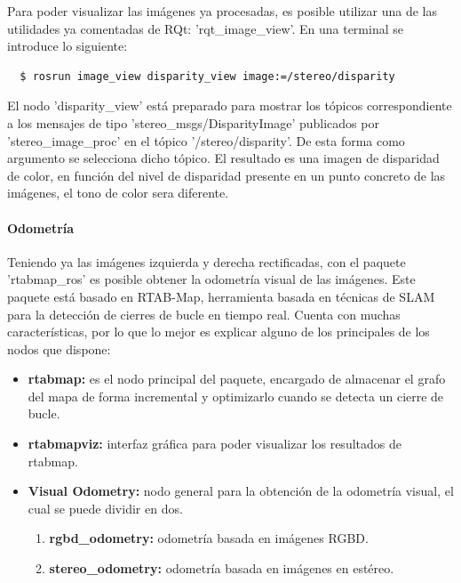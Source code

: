 Para poder visualizar las imágenes ya procesadas, es posible utilizar una de las
utilidades ya comentadas de RQt: 'rqt\_image\_view'. En una terminal se
introduce lo siguiente:
\\
\begin{lstlisting}
  $ rosrun image_view disparity_view image:=/stereo/disparity
\end{lstlisting}

El nodo 'disparity\_view' está preparado para mostrar los tópicos
correspondiente a los mensajes de tipo 'stereo\_msgs/DisparityImage' publicados
por 'stereo\_image\_proc' en el tópico '/stereo/disparity'. De esta forma como
argumento se selecciona dicho tópico. El resultado es una imagen de disparidad
de color, en función del nivel de disparidad presente en un punto concreto de
las imágenes, el tono de color sera diferente.

\paragraph{Odometría} \hspace{0pt}

Teniendo ya las imágenes izquierda y derecha rectificadas, con el paquete
'rtabmap\_ros' es posible obtener la odometría visual de las imágenes. Este
paquete está basado en RTAB-Map, herramienta basada en técnicas de SLAM para la
detección de cierres de bucle en tiempo real. Cuenta con muchas características,
por lo que lo mejor es explicar alguno de los principales de los nodos que
dispone:

\begin{itemize}
  \item \textbf{rtabmap:} es el nodo principal del paquete, encargado de
  almacenar el grafo del mapa de forma incremental y optimizarlo cuando se
  detecta un cierre de bucle.
  \item \textbf{rtabmapviz:} interfaz gráfica para poder visualizar los
  resultados de rtabmap.
  \item \textbf{Visual Odometry:} nodo general para la obtención de la odometría
  visual, el cual se puede dividir en dos.
  \begin{enumerate}
    \item \textbf{rgbd\_odometry:} odometría basada en imágenes RGBD.
    \item \textbf{stereo\_odometry:} odometría basada en imágenes en estéreo.
  \end{enumerate}
\end{itemize}

